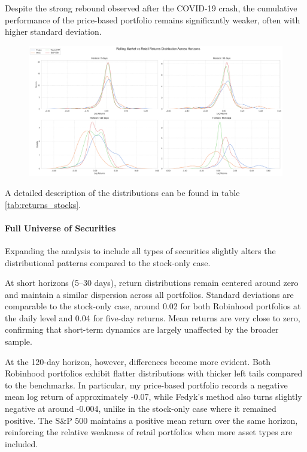Despite the strong rebound observed after the COVID-19 crash, the cumulative performance of the price-based portfolio remains significantly weaker, often with higher standard deviation.

\begin{figure}[h!]
    \centering
    \includegraphics[width=1\linewidth]
    {../images/distributions/comparison_1.png}
\end{figure}


A detailed description of the distributions can be found in table \ref{tab:returns_stocks}.

\paragraph{Full Universe of Securities}

Expanding the analysis to include all types of securities slightly alters the distributional patterns compared to the stock-only case.

At short horizons (5–30 days), return distributions remain centered around zero and maintain a similar dispersion across all portfolios. 
Standard deviations are comparable to the stock-only case, around 0.02 for both Robinhood portfolios at the daily level and 0.04 for five-day returns. 
Mean returns are very close to zero, confirming that short-term dynamics are largely unaffected by the broader sample.

At the 120-day horizon, however, differences become more evident. 
Both Robinhood portfolios exhibit flatter distributions with thicker left tails compared to the benchmarks. 
In particular, my price-based portfolio records a negative mean log return of approximately -0.07, while Fedyk’s method also turns slightly negative at around -0.004, unlike in the stock-only case where it remained positive. 
The S\&P 500 maintains a positive mean return over the same horizon, reinforcing the relative weakness of retail portfolios when more asset types are included.

